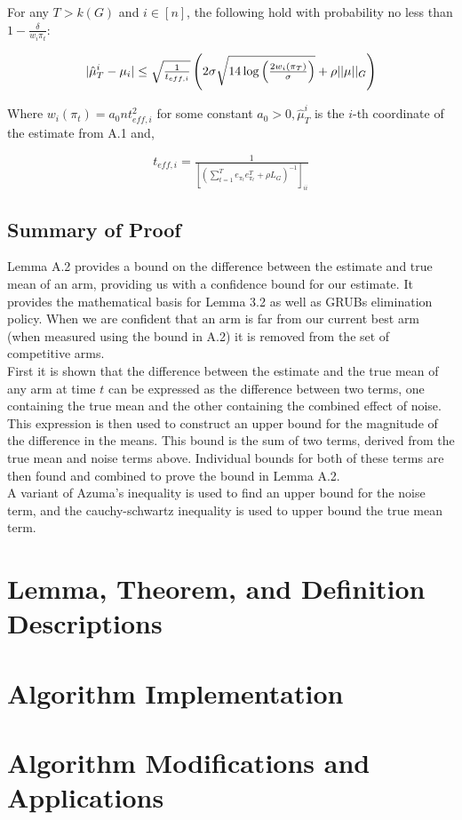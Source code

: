\documentclass{article}[12pt]
\begin{document}
For any $T > k(G)$ and $i \in [n]$, the following hold with probability no less than $1- \tfrac{\delta}{w_i \pi_t}$:

\begin{equation}
 |\hat{\mu}^{i}_{T} - \mu_{i}| \leq \sqrt{\tfrac{1}{t_{eff,i}}}\left( 2\sigma \sqrt{14 \log \left( \tfrac{2 w_i (\boldmath{\pi_T})}{\sigma} \right)} + \rho ||\boldmath{\mu}||_G \right)
\end{equation}


Where $w_i(\pi_t) = a_0 n t_{eff,i}^2$ for some constant $a_0 > 0, \hat{\mu}^i_T$ is the $i$-th coordinate of the estimate from A.1 and,


\begin{equation}
t_{eff,i} = \tfrac{1}{\left[ \left( \sum_{t=1}^T e_{\pi_t} e_{\pi_t}^T + \rho L_G \right)^{-1} \right]_{ii}}
\end{equation}

\subsection{Summary of Proof}

Lemma A.2 provides a bound on the difference between the estimate and true mean of an arm, providing us with a confidence bound for our estimate.
It provides the mathematical basis for Lemma 3.2 as well as GRUBs elimination policy.
When we are confident that an arm is far from our current best arm (when measured using the bound in A.2) it is removed from the set of competitive arms.	\\


First it is shown that the difference between the estimate and the true mean of any arm at time $t$ can be expressed as the difference between two terms,
one containing the true mean and the other containing the combined effect of noise. \\

This expression is then used to construct an upper bound for the magnitude of the difference in the means.
This bound is the sum of two terms, derived from the true mean and noise terms above.
Individual bounds for both of these terms are then found and combined to prove the bound in Lemma A.2. \\

A variant of Azuma’s inequality is used to find an upper bound for the noise term, and the cauchy-schwartz inequality is used to upper bound the true mean term.

\section{Lemma, Theorem, and Definition Descriptions}

\section{Algorithm Implementation}

\section{Algorithm Modifications and Applications}
\end{document}
